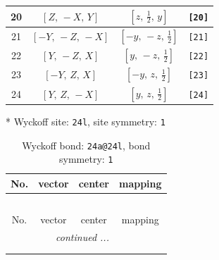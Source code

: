 \documentclass[fleqn,8pt]{jsarticle}
\begin{document}
\begin{longtable}{cccc}
20 & $\left[ Z,\, - X,\, Y \right]$ & $\left[ z,\, \frac{1}{2},\, y \right]$ & {\tt [20]} \\ \hline
21 & $\left[ - Y,\, - Z,\, - X \right]$ & $\left[ - y,\, - z,\, \frac{1}{2} \right]$ & {\tt [21]} \\ \hline
22 & $\left[ Y,\, - Z,\, X \right]$ & $\left[ y,\, - z,\, \frac{1}{2} \right]$ & {\tt [22]} \\ \hline
23 & $\left[ - Y,\, Z,\, X \right]$ & $\left[ - y,\, z,\, \frac{1}{2} \right]$ & {\tt [23]} \\ \hline
24 & $\left[ Y,\, Z,\, - X \right]$ & $\left[ y,\, z,\, \frac{1}{2} \right]$ & {\tt [24]} \\
\end{longtable}
* Wyckoff site: {\tt 24l}, site symmetry: {\tt 1}
\renewcommand{\arraystretch}{1.2}
\begin{longtable}{cccc}
\caption{Wyckoff bond: {\tt 24a@24l}, bond symmetry: {\tt 1}}
 \\
 \hline \hline
No. & vector & center & mapping \\ \hline \endfirsthead

\multicolumn{3}{l}{\tablename\ \thetable{}} \\
 \hline \hline
No. & vector & center & mapping \\ \hline \endhead

 \hline \hline
\multicolumn{3}{r}{\footnotesize\it continued ...} \\ \endfoot

 \hline \hline
\multicolumn{3}{r}{} \\ \endlastfoot


\end{longtable}
\end{document}
